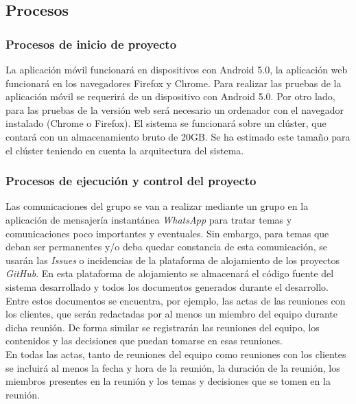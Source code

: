 \documentclass[12pt]{article}%
\begin{document}
\subsection{Procesos}

\subsubsection{Procesos de inicio de proyecto}

La aplicaci\'on m\'ovil funcionar\'a en dispositivos con Android 5.0, la aplicaci\'on web funcionar\'a en los navegadores Firefox y Chrome. Para realizar las pruebas de la aplicaci\'on m\'ovil se requerir\'a de un dispositivo con Android 5.0. Por otro lado, para las pruebas de la versi\'on web ser\'a necesario un ordenador con el navegador instalado (Chrome o Firefox). El sistema se funcionar\'a sobre un cl\'uster, que contar\'a con un almacenamiento bruto de 20GB. Se ha estimado este tama\~no para el cl\'uster teniendo en cuenta la arquitectura del sistema. 


\subsubsection{Procesos de ejecuci\'on y control del proyecto}

Las comunicaciones del grupo se van a realizar mediante un grupo en la aplicaci\'on de mensajer\'ia instant\'anea \textit{WhatsApp} para tratar temas y comunicaciones poco importantes y eventuales. Sin embargo, para temas que deban ser permanentes y/o deba quedar constancia de esta comunicaci\'on, se usar\'an las \textit{Issues} o incidencias de la plataforma de alojamiento de los proyectos \textit{GitHub}. En esta plataforma de alojamiento se almacenar\'a el c\'odigo fuente del sistema desarrollado y todos los documentos generados durante el desarrollo. Entre estos documentos se encuentra, por ejemplo, las actas de las reuniones con los clientes, que ser\'an redactadas por al menos un miembro del equipo durante dicha reuni\'on. De forma similar se registrar\'an las reuniones del equipo, los contenidos y las decisiones que puedan tomarse en esas reuniones.\\

En todas las actas, tanto de reuniones del equipo como reuniones con los clientes se incluir\'a al menos la fecha y hora de la reuni\'on, la duraci\'on de la reuni\'on, los miembros presentes en la reuni\'on y los temas y decisiones que se tomen en la reuni\'on.\\
\end{document}
